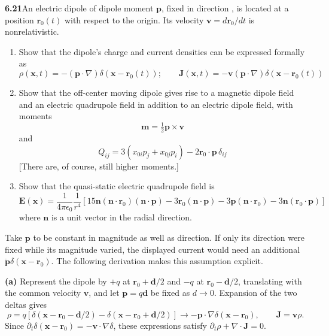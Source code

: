 \par\bigskip
\noindent\textbf{6.21}\quad An electric dipole of dipole moment $\mathbf{p}$, fixed in direction , is located at a position $\mathbf{r}_{0}(t)$ with respect to the origin. Its velocity $\mathbf{v}=d\mathbf{r}_{0}/dt$ is nonrelativistic.
\begin{enumerate}
\item[(a)] Show that the dipole's charge and current densities can be expressed formally as
\[
\rho(\mathbf{x},t)=-(\mathbf{p}\cdot\nabla)\delta(\mathbf{x}-\mathbf{r}_{0}(t));\qquad
\mathbf{J}(\mathbf{x},t)=-\mathbf{v}(\mathbf{p}\cdot\nabla)\delta(\mathbf{x}-\mathbf{r}_{0}(t))
\]
\item[(b)] Show that the off-center moving dipole gives rise to a magnetic dipole field and an electric quadrupole field in addition to an electric dipole field, with moments
\[
\mathbf{m}=\tfrac{1}{2}\mathbf{p}\times\mathbf{v}
\]
and
\[
Q_{ij}=3(x_{0i}p_{j}+x_{0j}p_{i})-2\mathbf{r}_{0}\cdot\mathbf{p}\,\delta_{ij}
\]
[There are, of course, still higher moments.]
\item[(c)] Show that the quasi-static electric quadrupole field is
\[
\mathbf{E}(\mathbf{x})=\frac{1}{4\pi\epsilon_{0}}\frac{1}{r^{4}}\left[15\mathbf{n}(\mathbf{n}\cdot\mathbf{r}_{0})(\mathbf{n}\cdot\mathbf{p})-3\mathbf{r}_{0}(\mathbf{n}\cdot\mathbf{p})-3\mathbf{p}(\mathbf{n}\cdot\mathbf{r}_{0})-3\mathbf{n}(\mathbf{r}_{0}\cdot\mathbf{p})\right]
\]
where $\mathbf{n}$ is a unit vector in the radial direction.
\end{enumerate}
\solution

Take $\mathbf p$ to be constant in magnitude as well as direction. If only
its direction were fixed while its magnitude varied, the displayed current
would need an additional $\dot{\mathbf p}\delta(\mathbf x-\mathbf r_0)$.
The following derivation makes this assumption explicit.

\textbf{(a)} Represent the dipole by $+q$ at $\mathbf r_0+\mathbf d/2$
and $-q$ at $\mathbf r_0-\mathbf d/2$, translating with the common velocity
$\mathbf v$, and let $\mathbf p=q\mathbf d$ be fixed as $d\to0$.
Expansion of the two deltas gives
\[
\rho=q[\delta(\mathbf x-\mathbf r_0-\mathbf d/2)
-\delta(\mathbf x-\mathbf r_0+\mathbf d/2)]
\longrightarrow\boxed{-\mathbf p\cdot\nabla\delta(\mathbf x-\mathbf r_0)},
\qquad \boxed{\mathbf J=\mathbf v\rho}.
\]
Since $\partial_t\delta(\mathbf x-\mathbf r_0)=-\mathbf v\cdot\nabla\delta$,
these expressions satisfy $\partial_t\rho+\nabla\cdot\mathbf J=0$.


